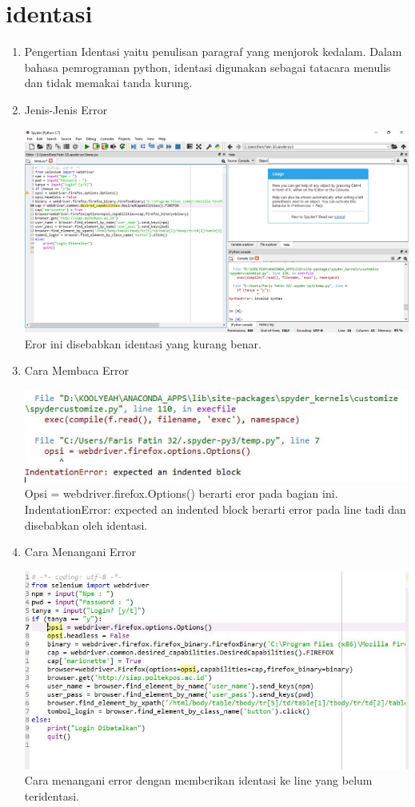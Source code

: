 \section{identasi}
\begin{enumerate}
\item Pengertian
Identasi yaitu penulisan paragraf yang menjorok kedalam. Dalam bahasa pemrograman python, identasi digunakan sebagai tatacara menulis dan tidak memakai tanda kurung.

\item{Jenis-Jenis Error}


\includegraphics{gambar/identasi1.png}
Eror ini disebabkan identasi yang kurang benar.\\


\item{Cara Membaca Error}

\includegraphics{gambar/identasi3.jpg}
Opsi = webdriver.firefox.Options() berarti eror pada bagian ini.
IndentationError: expected an indented block berarti error pada line tadi dan disebabkan oleh identasi.\\


\item{Cara Menangani Error}

\includegraphics{gambar/identasi4.jpg}
Cara menangani error dengan memberikan identasi ke line yang belum teridentasi.\\

\end{enumerate}